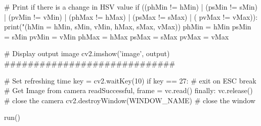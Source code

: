 \begin{pyverbatim}
                # Print if there is a change in HSV value
                if ((phMin != hMin) | (psMin != sMin) | (pvMin != vMin) | (phMax != hMax) | (psMax != sMax) | (
                        pvMax != vMax)):
                    print("(hMin = %
                        hMin, sMin, vMin, hMax, sMax, vMax))
                    phMin = hMin
                    psMin = sMin
                    pvMin = vMin
                    phMax = hMax
                    psMax = sMax
                    pvMax = vMax

                # Display output image
                cv2.imshow('image', output)
                #############################

                # Set refreshing time
                key = cv2.waitKey(10)
                if key == 27:  # exit on ESC
                    break
                # Get Image from camera
                readSuccessful, frame = vc.read()
        finally:
            vc.release()  # close the camera
            cv2.destroyWindow(WINDOW_NAME)  # close the window


run()

\end{pyverbatim}


